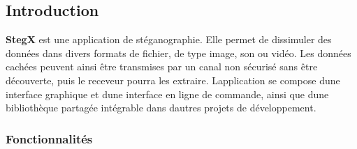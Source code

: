  





\subsection*{Introduction }

{\bfseries StegX} est une application de stéganographie. Elle permet de dissimuler des données dans divers formats de fichier, de type image, son ou vidéo. Les données cachées peuvent ainsi être transmises par un canal non sécurisé sans être découverte, puis le receveur pourra les extraire. L\textquotesingle{}application se compose d\textquotesingle{}une interface graphique et d\textquotesingle{}une interface en ligne de commande, ainsi que d\textquotesingle{}une bibliothèque partagée intégrable dans d\textquotesingle{}autres projets de développement.

\subsubsection*{Fonctionnalités }


